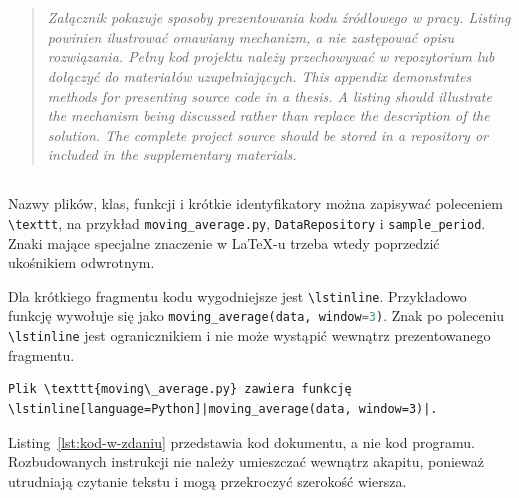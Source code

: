 \chapter{}
\label{app:kod}

\begin{quote}
\itshape
\ploren
  {Załącznik pokazuje sposoby prezentowania kodu źródłowego w pracy. Listing powinien ilustrować omawiany mechanizm, a nie zastępować opisu rozwiązania. Pełny kod projektu należy przechowywać w repozytorium lub dołączyć do materiałów uzupełniających.}
  {This appendix demonstrates methods for presenting source code in a thesis. A listing should illustrate the mechanism being discussed rather than replace the description of the solution. The complete project source should be stored in a repository or included in the supplementary materials.}
\end{quote}

\section{}

Nazwy plików, klas, funkcji i krótkie identyfikatory można zapisywać poleceniem
\verb|\texttt|, na przykład \texttt{moving\_average.py}, \texttt{DataRepository}
i \texttt{sample\_period}. Znaki mające specjalne znaczenie w LaTeX-u trzeba wtedy
poprzedzić ukośnikiem odwrotnym.

Dla krótkiego fragmentu kodu wygodniejsze jest \verb|\lstinline|. Przykładowo funkcję
wywołuje się jako \lstinline[language=Python]|moving_average(data, window=3)|.
Znak po poleceniu \verb|\lstinline| jest ogranicznikiem i nie może wystąpić wewnątrz
prezentowanego fragmentu.

\begin{lstlisting}[style=thesis,caption={Kod LaTeX-a wstawiający identyfikator i fragment kodu w zdaniu},label={lst:kod-w-zdaniu}]
Plik \texttt{moving\_average.py} zawiera funkcję
\lstinline[language=Python]|moving_average(data, window=3)|.
\end{lstlisting}

Listing~\ref{lst:kod-w-zdaniu} przedstawia kod dokumentu, a nie kod programu.
Rozbudowanych instrukcji nie należy umieszczać wewnątrz akapitu, ponieważ utrudniają
czytanie tekstu i mogą przekroczyć szerokość wiersza.

\section{}

